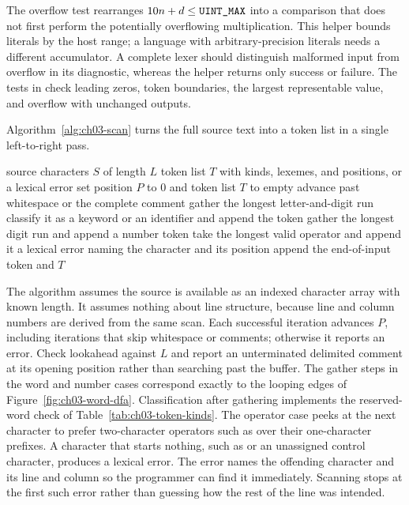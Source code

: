 \begin{listing}[htbp]
  \inputminted{c}{example-code/visual-labs/decimal.c}
  \caption{Checked decimal scanning leaves the cursor and value unchanged when no digits fit the host unsigned type.}
  \label{lst:visual-decimal}
\end{listing}

The overflow test rearranges $10n+d\leq\texttt{UINT\_MAX}$ into a comparison that does not first perform the potentially overflowing multiplication.
This helper bounds literals by the host  range; a language with arbitrary-precision literals needs a different accumulator.
A complete lexer should distinguish malformed input from overflow in its diagnostic, whereas the helper returns only success or failure.
The tests in  check leading zeros, token boundaries, the largest representable value, and overflow with unchanged outputs.

Algorithm~\ref{alg:ch03-scan} turns the full source text into a token list in a single left-to-right pass.
\begin{algorithm}
\caption{Maximal-munch scanning of Mini source text.}
\label{alg:ch03-scan}
\begin{pseudocode}
\Require source characters $S$ of length $L$
\Ensure token list $T$ with kinds, lexemes, and positions, or a lexical error
\State set position $P$ to $0$ and token list $T$ to empty
 \State advance past whitespace or the complete comment
 \State gather the longest letter-and-digit run
\State classify it as a keyword or an identifier and append the token
 \State gather the longest digit run and append a number token
 \State take the longest valid operator and append it
\Else \State \Return a lexical error naming the character and its position
\EndIf
\EndWhile
\State append the end-of-input token and \Return $T$
\EndFunction
\end{pseudocode}
\end{algorithm}
The algorithm assumes the source is available as an indexed character array with known length.
It assumes nothing about line structure, because line and column numbers are derived from the same scan.
Each successful iteration advances $P$, including iterations that skip whitespace or comments; otherwise it reports an error.
Check lookahead against $L$ and report an unterminated delimited comment at its opening position rather than searching past the buffer.
The gather steps in the word and number cases correspond exactly to the looping edges of Figure~\ref{fig:ch03-word-dfa}.
Classification after gathering implements the reserved-word check of Table~\ref{tab:ch03-token-kinds}.
The operator case peeks at the next character to prefer two-character operators such as \code{<=} over their one-character prefixes.
A character that starts nothing, such as  or an unassigned control character, produces a lexical error.
The error names the offending character and its line and column so the programmer can find it immediately.
Scanning stops at the first such error rather than guessing how the rest of the line was intended.

